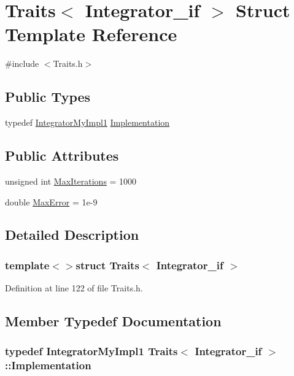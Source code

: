 \hypertarget{struct_traits_3_01_integrator__if_01_4}{\section{Traits$<$ Integrator\-\_\-if $>$ Struct Template Reference}
\label{struct_traits_3_01_integrator__if_01_4}
}


{\ttfamily \#include $<$Traits.\-h$>$}

\subsection*{Public Types}
\begin{DoxyCompactItemize}
\item 
typedef \hyperlink{class_integrator_my_impl1}{Integrator\-My\-Impl1} \hyperlink{struct_traits_3_01_integrator__if_01_4_a5bc6f81f74b024535b7d5ec3a5a414f0}{Implementation}
\end{DoxyCompactItemize}
\subsection*{Public Attributes}
\begin{DoxyCompactItemize}
\item 
unsigned int \hyperlink{struct_traits_3_01_integrator__if_01_4_a00ccc8b3ca58fdd91a0b40c59a02879b}{Max\-Iterations} = 1000
\item 
double \hyperlink{struct_traits_3_01_integrator__if_01_4_a32e086683b5e71dd7be4225d717d22a2}{Max\-Error} = 1e-\/9
\end{DoxyCompactItemize}


\subsection{Detailed Description}
\subsubsection*{template$<$$>$struct Traits$<$ Integrator\-\_\-if $>$}



Definition at line 122 of file Traits.\-h.



\subsection{Member Typedef Documentation}
\hypertarget{struct_traits_3_01_integrator__if_01_4_a5bc6f81f74b024535b7d5ec3a5a414f0}{
\subsubsection[{Implementation}]{\setlength{\rightskip}{0pt plus 5cm}typedef {\bf Integrator\-My\-Impl1} {\bf Traits}$<$ {\bf Integrator\-\_\-if} $>$\-::{\bf Implementation}}}\label{struct_traits_3_01_integrator__if_01_4_a5bc6f81f74b024535b7d5ec3a5a414f0}


